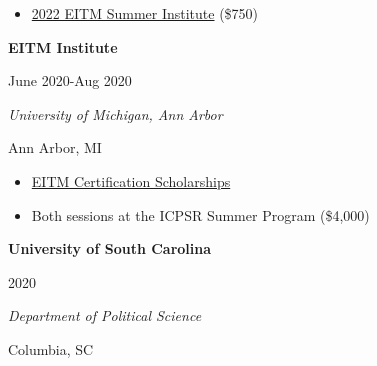\documentclass[
  16,
]{article}
\providecommand{\tightlist}{%
  \setlength{\itemsep}{0pt}\setlength{\parskip}{0pt}}\usepackage{longtable,booktabs,array}
\begin{document}
\begin{itemize}
\tightlist
\item
  \href{https://eitminstitute.org/institute/2022/}{2022 EITM Summer Institute}
  (\$750)
\end{itemize}

\vspace{7pt}

\begin{large}
  \begin{multicols}{2}
    \begin{flushleft}{\bf EITM Institute}\end{flushleft}
    \begin{flushright}June 2020-Aug 2020\end{flushright}
  \end{multicols}
  \begin{multicols}{2}
    \begin{flushleft}\textit{University of Michigan, Ann Arbor}\end
    {flushleft}\begin{flushright}Ann Arbor, MI\end
    {flushright}
  \end{multicols}
\end{large}
\vspace{-0.16cm}

\begin{itemize}
\tightlist
\item
  \href{https://52.2.147.143/icpsrweb/content/sumprog/scholarships/winners-2020.html}{EITM Certification Scholarships}
\item
  Both sessions at the ICPSR Summer Program (\$4,000)
\end{itemize}

\vspace{7pt}

\begin{large}
  \begin{multicols}{2}
    \begin{flushleft}{\bf University of South Carolina}\end{flushleft}
    \begin{flushright}2020\end{flushright}
  \end{multicols}
  \vspace{-0.17cm}
  \begin{multicols}{2}
    \begin{flushleft}\textit{Department of Political Science}\end
    {flushleft}\begin{flushright}Columbia, SC\end
    {flushright}
  \end{multicols}
\end{large}
\vspace{-0.16cm}
\end{document}
